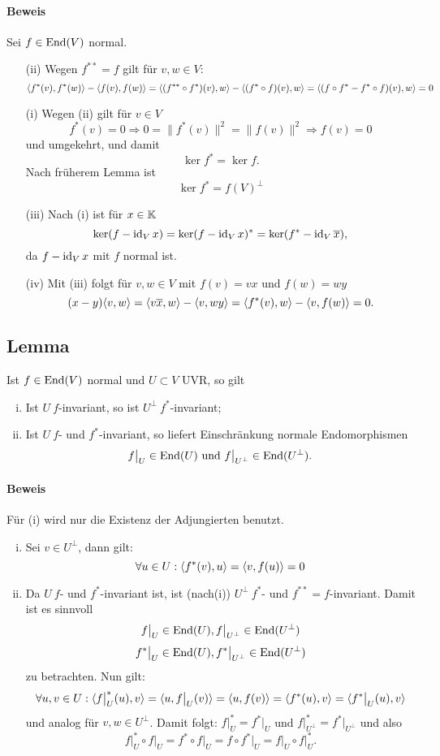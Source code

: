 \paragraph{Beweis}
	Sei $ f\in \operatorname{End}(V) $ normal.
		\begin{enumerate}
			\item[(ii)] Wegen $ f^{**} = f $ gilt für $ v,w\in V $:
				\[ \langle f^*(v),f^*(w) \rangle-\langle f(v),f(w) \rangle = \langle (f^{**}\circ f^*)(v),w \rangle-\langle (f^*\circ f)(v),w \rangle = \langle (f\circ f^*-f^*\circ f)(v),w \rangle = 0 \]
			\item[(i)] Wegen (ii) gilt für $ v\in V $
				\[ f^*(v) = 0 \Rightarrow 0 = \|f^*(v)\|^2 = \|f(v)\|^2\Rightarrow f(v) = 0 \]
				und umgekehrt, und damit
				\[ \ker f^* = \ker f. \]
				Nach früherem Lemma ist
					\[ \ker f^* = f(V)^\perp \]
			\item[(iii)] Nach (i) ist für $ x\in \mathbb{K} $
				\[ \ker(f-\operatorname{id}_Vx) = \ker(f-\operatorname{id}_Vx)^* = \ker(f^*-\operatorname{id}_V\overline{x}), \]
				da $ f-\operatorname{id}_Vx $ mit $ f $ normal ist.
			\item[(iv)] Mit (iii) folgt für $ v,w\in V $ mit $ f(v) = vx $ und $ f(w) = wy $	\[ (x-y)\langle v,w \rangle=\langle v\overline{x},w \rangle-\langle v,wy \rangle = \langle f^*(v),w \rangle-\langle v,f(w) \rangle = 0. \] 
		\end{enumerate}

\subsection{Lemma}
\begin{Lemma}[]
	Ist $ f\in \operatorname{End}(V) $ normal und $ U\subset V $ UVR, so gilt
		\begin{enumerate}[(i)]
			\item Ist $ U\ f $-invariant, so ist $ U^\perp\ f^* $-invariant;
			\item Ist $ U\ f $- und $ f^* $-invariant, so liefert Einschränkung normale Endomorphismen
				\[ f\big|_U \in \operatorname{End}(U) \text{ und } f\big|_{U^\perp}\in \operatorname{End}(U^\perp). \]
		\end{enumerate}
\end{Lemma}
\paragraph{Beweis}
	Für (i) wird nur die Existenz der Adjungierten benutzt.
		\begin{enumerate}[(i)]
			\item Sei $ v\in U^\perp $, dann gilt:
				\[ \forall u\in U: \langle f^*(v),u \rangle = \langle v,f(u) \rangle = 0 \]
			\item Da $ U\ f $- und $ f^* $-invariant ist, ist (nach(i)) $ U^\perp\ f^*$- und $ f^{**} = f $-invariant.		
			Damit ist es sinnvoll
				\[ f\big|_U \in \operatorname{End}(U), f\big|_{U^\perp}\in \operatorname{End}(U^\perp) \]
				\[ f^*\big|_U\in \operatorname{End}(U), f^*\big|_{U^\perp}\in \operatorname{End}(U^\perp) \]
			zu betrachten. Nun gilt:
				\[ \forall u,v\in U: \langle f\big|_U^*(u),v \rangle = \langle u,f\big|_U(v) \rangle = \langle u,f(v) \rangle = \langle f^*(u),v \rangle = \langle f^*\big|_U(u),v \rangle \]
			und analog für $ v,w\in U^\perp $. Damit folgt: $ f\big|_U^* = f^*\big|_U $ und $ f\big|^*_{U^\perp} = f^*\big|_{U^\perp}$ und also
				\[ f\big|_U^* \circ f\big|_U = f^*\circ f\big|_U = f\circ f^*\big|_U = f\big|_U \circ f\big|_U^*. \]
		\end{enumerate}
